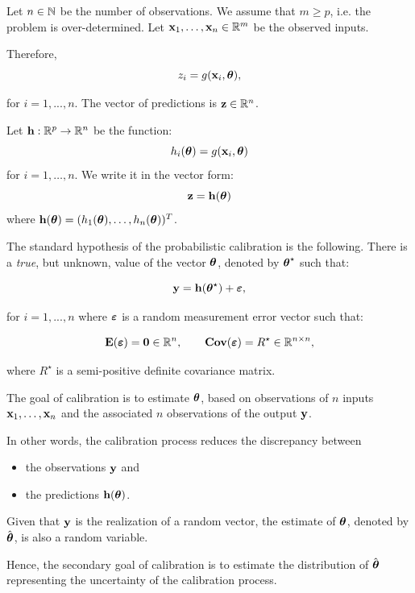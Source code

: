 \documentclass{beamer}
\begin{document}

\begin{frame}
Let $n \in \mathbb{N}$ be the number of observations. 
We assume that $m \geq p$, i.e. the problem is over-determined. 
Let ${\bf x}_1, \ldots, {\bf x}_n \in \mathbb{R}^{m}$ be the observed inputs. 

Therefore, 
$$
z_i = g({\bf x}_i, \boldsymbol{\theta}),
$$

for $i=1,...,n$. 
The vector of predictions is ${\bf z} \in \mathbb{R}^{n}$. 

Let ${\bf h} : \mathbb{R}^p \rightarrow \mathbb{R}^{n}$ be the function:
$$
h_i(\boldsymbol{\theta}) = g({\bf x}_i, \boldsymbol{\theta})
$$
for $i=1, \ldots, n$. 
We write it in the vector form:
$$
{\bf z} = {\bf h}(\boldsymbol{\theta})
$$
where ${\bf h}(\boldsymbol{\theta}) = (h_1(\boldsymbol{\theta}), \ldots, h_n(\boldsymbol{\theta}))^T$.

\end{frame}


\begin{frame}
The standard hypothesis of the probabilistic calibration is the following. 
There is a \emph{true}, but unknown, value of the vector $\boldsymbol{\theta}$, 
denoted by $\boldsymbol{\theta}^\star$ such that:

$$
{\bf y} = {\bf h}(\boldsymbol{\theta}^\star) + \boldsymbol{\varepsilon},
$$

for $i=1,...,n$ where $\boldsymbol{\varepsilon}$ is a random
measurement error vector such that:

$$
\mathbf{E}(\boldsymbol{\varepsilon}) = \boldsymbol{0} \in \mathbb{R}^{n}, \qquad 
\mathbf{Cov}(\boldsymbol{\varepsilon}) = R^\star \in \mathbb{R}^{n\times n},
$$

where $R^\star$ is a semi-positive definite covariance matrix.

\end{frame}


\begin{frame}
The goal of calibration is to estimate $\boldsymbol{\theta}$, based on
observations of $n$ inputs
${\bf x}_1, \ldots, {\bf x}_n$ and the associated $n$
observations of the output ${\bf y}$. 

In other words, the calibration process reduces the discrepancy between 
\begin{itemize}
\item  the observations ${\bf y}$ and 
\item  the predictions ${\bf h}(\boldsymbol{\theta})$. 
\end{itemize}

Given that ${\bf y}$ is the realization of a random
vector, the estimate of $\boldsymbol{\theta}$, denoted by
$\hat{\boldsymbol{\theta}}$, is also a random variable. 

Hence, the secondary goal of calibration is to estimate the distribution of
$\hat{\boldsymbol{\theta}}$ representing the uncertainty of the
calibration process.

\end{frame}
\end{document}
